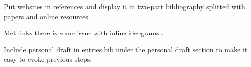 Put websites in references and display it in two-part bibliography splitted with papers and online resources.

Methinks there is some issue with inline ideograms\dots{}

Include personal draft in entries.bib under the personal draft section to make it easy to evoke previous steps.

